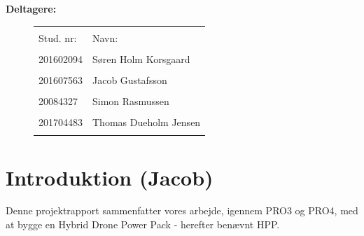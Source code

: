 \textbf{Deltagere:}
\begin{figure}[h]
  \centering
  \begin{tabular}{p{5cm}p{10cm}}
    &\\
    Stud. nr: & Navn: \\
    \hline
    &\\
    201602094 & Søren Holm Korsgaard \\
    &\\
    201607563 & Jacob Gustafsson \\
    &\\
    20084327 & Simon Rasmussen \\
    &\\
    201704483 & Thomas Dueholm Jensen \\
    &\\
    \hline
  \end{tabular}

\end{figure}
\vspace{-5mm}
\setcounter{tocdepth}{2}
\setcounter{secnumdepth}{4}
\clearpage
\renewcommand{\contentsname}{Table of Contents}
\tableofcontents
\newpage
\setcounter{page}{1}

\fancyhf{}
\fancyhead[LE,RO]{\leftmark}
\fancyhead[RE,LO]{\rightmark}

\chapter{Introduktion (Jacob)}
\label{sec:introduktion-1}

Denne projektrapport sammenfatter vores arbejde, igennem PRO3 og PRO4, med at bygge en Hybrid Drone Power Pack - herefter benævnt HPP.

